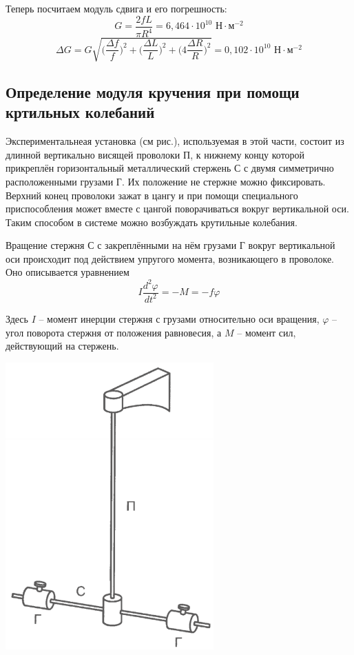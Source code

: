 \documentclass[a4paper, 12pt]{article} %
\begin{document}
Теперь посчитаем модуль сдвига и его погрешность:
\[G = \frac{2fL}{\pi R^4} = 6,464 \cdot 10^{10}\text{ Н} \cdot \text{м}^{-2}\]
\[\Delta G = G \sqrt{\Big( \frac{\Delta f}{f}\Big) ^2 + \Big(\frac{\Delta L}{L} \Big)^2 + \Big(4\frac{\Delta R}{R} \Big)^2}= 0,102 \cdot 10^{10}\text{ Н} \cdot \text{м}^{-2}\]

\subsection{Определение модуля кручения при помощи кртильных колебаний}

Экспериментальнеая установка (см рис.), используемая в этой части, состоит из длинной вертикально висящей проволоки П, к нижнему концу которой прикреплён горизонтальный металлический стержень С с двумя симметрично расположенными грузами Г. Их положение не стержне можно фиксировать. Верхний конец проволоки зажат в цангу и при помощи специального приспособления может вместе с цангой поворачиваться вокруг вертикальной оси. Таким способом в системе можно возбуждать крутильные колебания. 

Вращение стержня С с закреплёнными на нём грузами Г вокруг вертикальной оси происходит под действием упругого момента, возникающего в проволоке. Оно описывается уравнением
\[I \frac{d^2 \varphi}{d t^2} = -M = -f \varphi\]

Здесь $I$ -- момент инерции стержня с грузами относительно оси вращения, $\varphi$ -- угол поворота стержня от положения равновесия, а $M$ -- момент сил, действующий на стержень. 

\begin{center}
    {\includegraphics[width=8cm]{3}}
\end{center}
\end{document}

